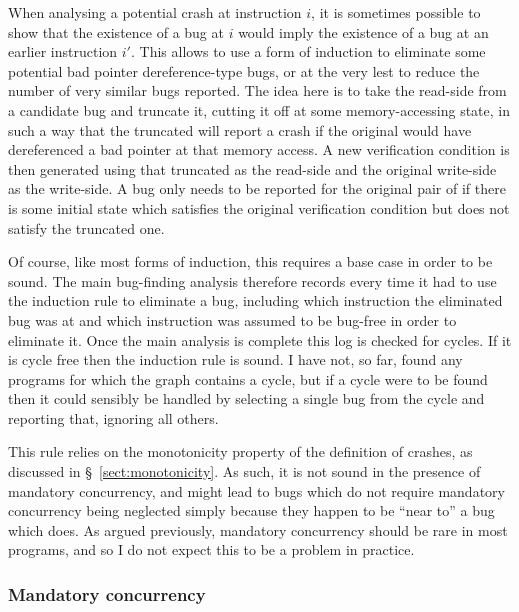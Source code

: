 When analysing a potential crash at instruction $i$, it is sometimes
possible to show that the existence of a bug at $i$ would imply the
existence of a bug at an earlier instruction $i'$.  This allows
{\technique} to use a form of induction to eliminate some potential
bad pointer dereference-type bugs, or at the very lest to reduce the
number of very similar bugs reported.  The idea here is to take the
read-side {\StateMachine} from a candidate bug and truncate it,
cutting it off at some memory-accessing state, in such a way that the
truncated {\StateMachine} will report a crash if the original
{\StateMachine} would have dereferenced a bad pointer at that memory
access.  A new verification condition is then generated using that
truncated {\StateMachine} as the read-side {\StateMachine} and the
original write-side {\StateMachine} as the write-side.  A bug only
needs to be reported for the original pair of {\StateMachines} if
there is some initial state which satisfies the original verification
condition but does not satisfy the truncated one.

Of course, like most forms of induction, this requires a base case in
order to be sound.  The main bug-finding analysis therefore records
every time it had to use the induction rule to eliminate a bug,
including which instruction the eliminated bug was at and which
instruction was assumed to be bug-free in order to eliminate it.  Once
the main analysis is complete this log is checked for cycles.  If it
is cycle free then the induction rule is sound.  I have not, so far,
found any programs for which the graph contains a cycle, but if a
cycle were to be found then it could sensibly be handled by selecting
a single bug from the cycle and reporting that, ignoring all others.

This rule relies on the monotonicity property of the definition of
crashes, as discussed in \S~\ref{sect:monotonicity}.  As such, it is
not sound in the presence of mandatory concurrency, and might lead to
bugs which do not require mandatory concurrency being neglected simply
because they happen to be ``near to'' a bug which does.  As argued
previously, mandatory concurrency should be rare in most programs, and
so I do not expect this to be a problem in practice.  


\subsubsection{Mandatory concurrency}
\label{sect:mandatory_concurrency}

